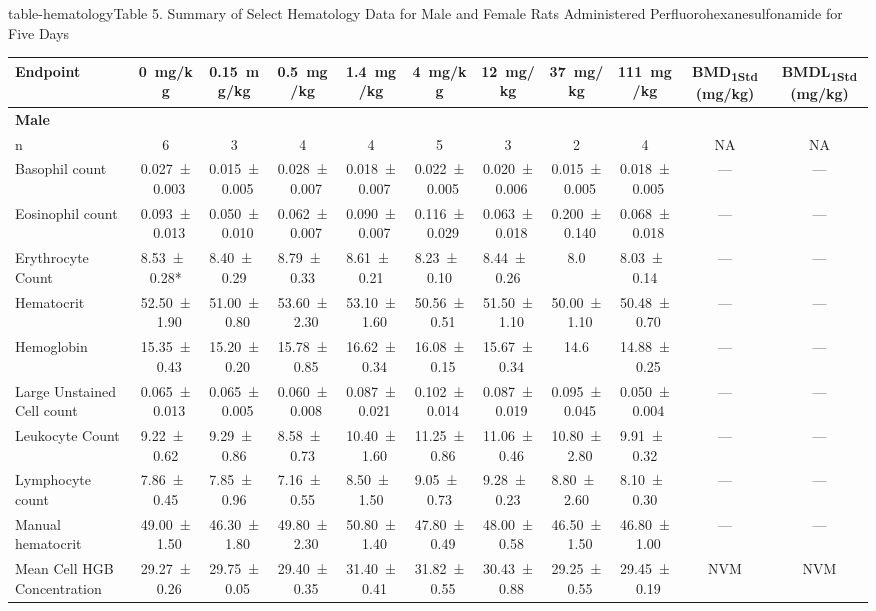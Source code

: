 \begin{landscape}
\begin{niehstable}{table-hematology}{Table 5. Summary of Select Hematology Data for Male and Female Rats Administered Perfluorohexanesulfonamide for Five Days}
\begin{tabular}{lcccccccccc}
\toprule
Endpoint & 0~mg/kg & 0.15~mg/kg & 0.5~mg/kg & 1.4~mg/kg & 4~mg/kg & 12~mg/kg & 37~mg/kg & 111~mg/kg & BMD\textsubscript{1Std} (mg/kg) & BMDL\textsubscript{1Std} (mg/kg) \\
\midrule
\multicolumn{11}{l}{\textbf{Male}} \\
n & 6 & 3 & 4 & 4 & 5 & 3 & 2 & 4 & NA & NA \\
Basophil count & 0.027 ± 0.003 & 0.015 ± 0.005 & 0.028 ± 0.007 & 0.018 ± 0.007 & 0.022 ± 0.005 & 0.020 ± 0.006 & 0.015 ± 0.005 & 0.018 ± 0.005 & — & — \\
Eosinophil count & 0.093 ± 0.013 & 0.050 ± 0.010 & 0.062 ± 0.007 & 0.090 ± 0.007 & 0.116 ± 0.029 & 0.063 ± 0.018 & 0.200 ± 0.140 & 0.068 ± 0.018 & — & — \\
Erythrocyte Count & 8.53 ± 0.28* & 8.40 ± 0.29 & 8.79 ± 0.33 & 8.61 ± 0.21 & 8.23 ± 0.10 & 8.44 ± 0.26 & 8.0 & 8.03 ± 0.14 & — & — \\
Hematocrit & 52.50 ± 1.90 & 51.00 ± 0.80 & 53.60 ± 2.30 & 53.10 ± 1.60 & 50.56 ± 0.51 & 51.50 ± 1.10 & 50.00 ± 1.10 & 50.48 ± 0.70 & — & — \\
Hemoglobin & 15.35 ± 0.43 & 15.20 ± 0.20 & 15.78 ± 0.85 & 16.62 ± 0.34 & 16.08 ± 0.15 & 15.67 ± 0.34 & 14.6 & 14.88 ± 0.25 & — & — \\
Large Unstained Cell count & 0.065 ± 0.013 & 0.065 ± 0.005 & 0.060 ± 0.008 & 0.087 ± 0.021 & 0.102 ± 0.014 & 0.087 ± 0.019 & 0.095 ± 0.045 & 0.050 ± 0.004 & — & — \\
Leukocyte Count & 9.22 ± 0.62 & 9.29 ± 0.86 & 8.58 ± 0.73 & 10.40 ± 1.60 & 11.25 ± 0.86 & 11.06 ± 0.46 & 10.80 ± 2.80 & 9.91 ± 0.32 & — & — \\
Lymphocyte count & 7.86 ± 0.45 & 7.85 ± 0.96 & 7.16 ± 0.55 & 8.50 ± 1.50 & 9.05 ± 0.73 & 9.28 ± 0.23 & 8.80 ± 2.60 & 8.10 ± 0.30 & — & — \\
Manual hematocrit & 49.00 ± 1.50 & 46.30 ± 1.80 & 49.80 ± 2.30 & 50.80 ± 1.40 & 47.80 ± 0.49 & 48.00 ± 0.58 & 46.50 ± 1.50 & 46.80 ± 1.00 & — & — \\
Mean Cell HGB Concentration & 29.27 ± 0.26 & 29.75 ± 0.05 & 29.40 ± 0.35 & 31.40 ± 0.41 & 31.82 ± 0.55 & 30.43 ± 0.88 & 29.25 ± 0.55 & 29.45 ± 0.19 & NVM & NVM \\

\end{tabular}
\end{niehstable}
\end{landscape}
